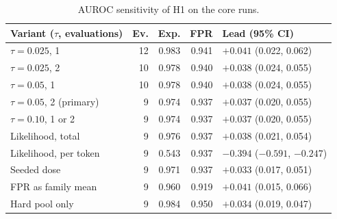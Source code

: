 \documentclass[11pt]{article}
\begin{document}
\makeatletter
\setlength{\@fptop}{0pt}
\setlength{\@fpbot}{0pt plus 1fil}
\makeatother
\setlength{\intextsep}{4pt plus 2pt minus 2pt}   %
\begin{table}[h]
  \centering
  \scriptsize
  \setlength{\tabcolsep}{3pt}
  \begin{tabular}{@{}lrrrl@{}}
    \toprule
    Variant ($\tau$, evaluations) & Ev. & Exp. & FPR & Lead (95\% CI) \\
    \midrule
    $\tau = 0.025$, 1 & 12 & 0.983 & 0.941 & $+0.041$ (0.022, 0.062) \\
    $\tau = 0.025$, 2 & 10 & 0.978 & 0.940 & $+0.038$ (0.024, 0.055) \\
    $\tau = 0.05$, 1 & 10 & 0.978 & 0.940 & $+0.038$ (0.024, 0.055) \\
    $\tau = 0.05$, 2 (primary) & 9 & 0.974 & 0.937 & $+0.037$ (0.020, 0.055) \\
    $\tau = 0.10$, 1 or 2 & 9 & 0.974 & 0.937 & $+0.037$ (0.020, 0.055) \\
    Likelihood, total & 9 & 0.976 & 0.937 & $+0.038$ (0.021, 0.054) \\
    Likelihood, per token & 9 & 0.543 & 0.937 & $-0.394$ ($-0.591$, $-0.247$) \\
    Seeded dose & 9 & 0.971 & 0.937 & $+0.033$ (0.017, 0.051) \\
    FPR as family mean & 9 & 0.960 & 0.919 & $+0.041$ (0.015, 0.066) \\
    Hard pool only & 9 & 0.984 & 0.950 & $+0.034$ (0.019, 0.047) \\
    \bottomrule
  \end{tabular}
  \caption{AUROC sensitivity of H1 on the core runs.}
  \label{tab:sensitivity}
\end{table}
\end{document}
